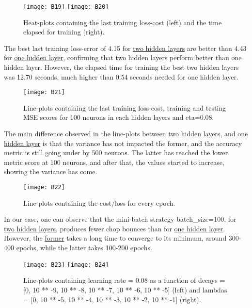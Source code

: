 \begin{figure}[H]
\label{fig:B13}
\centering
\texttt{[image: B19]}
\texttt{[image: B20]}
\caption{Heat-plots containing the last training loss-cost (left) and the time elapsed for training (right).}
\end{figure}

The best last training loss-error of 4.15 for \hyperref[fig:B13]{two hidden layers} are better than 4.43 for \hyperref[fig:B4]{one hidden layer}, confirming that two hidden layers perform better than one hidden layer. However, the elapsed time for training the best two hidden layers was 12.70 seconds, much higher than 0.54 seconds needed for one hidden layer.

\begin{figure}[H]
\label{fig:B14}
\centering
\texttt{[image: B21]}
\caption{Line-plots containing the last training loss-cost, training and testing MSE scores for 100 neurons in each hidden layers and eta=0.08.}
\end{figure}

The main difference observed in the line-plots between \hyperref[fig:B14]{two hidden layers}, and \hyperref[fig:B5]{one hidden layer} is that the variance has not impacted the former, and the accuracy metric is still going under by 500 neurons. The latter has reached the lower metric score at 100 neurons, and after that, the values started to increase, showing the variance has come.

\begin{figure}[H]
\label{fig:B15}
\centering
\texttt{[image: B22]}
\caption{Line-plots containing the cost/loss for every epoch.}
\end{figure}

In our case, one can observe that the mini-batch strategy batch\_size=100, for \hyperref[fig:B15]{two hidden layers}, produces fewer chop bounces than for \hyperref[fig:B6]{one hidden layer}. However, the \hyperref[fig:B15]{former} takes a long time to converge to its minimum, around 300-400 epochs, while the \hyperref[fig:B6]{latter} takes 100-200 epochs.

\begin{figure}[H]
\label{fig:B16}
\centering
\texttt{[image: B23]}
\texttt{[image: B24]}
\caption{Line-plots containing learning rate = 0.08 as a function of decays = [0, 10 ** -9, 10 ** -8, 10 ** -7, 10 ** -6, 10 ** -5] (left) and lambdas = [0, 10 ** -5, 10 ** -4, 10 ** -3, 10 ** -2, 10 ** -1] (right).}
\end{figure}

